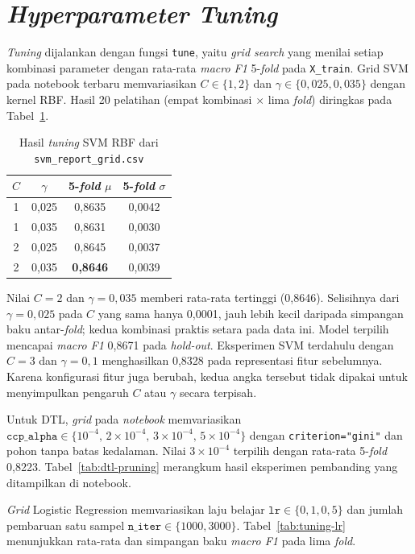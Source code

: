 \section{\textit{Hyperparameter Tuning}}

\textit{Tuning} dijalankan dengan fungsi \texttt{tune}, yaitu \textit{grid search}
yang menilai setiap kombinasi parameter dengan rata-rata \textit{macro F1}
5-\textit{fold} pada \texttt{X\_train}. Grid SVM pada notebook terbaru
memvariasikan $C\in\{1,2\}$ dan $\gamma\in\{0{,}025,0{,}035\}$ dengan
kernel RBF. Hasil 20 pelatihan (empat kombinasi $\times$ lima
\textit{fold}) diringkas pada Tabel~\ref{tab:tuning-svm}.

\begin{table}[H]
	\centering
	\caption{Hasil \textit{tuning} SVM RBF dari \texttt{svm\_report\_grid.csv}}
	\label{tab:tuning-svm}
	\begin{tabular}{c c c c}
		\toprule
		$C$ & $\gamma$ & \textbf{5-\textit{fold} $\mu$} & \textbf{5-\textit{fold} $\sigma$} \\
		\midrule
		1 & 0,025 & 0,8635 & 0,0042 \\
		1 & 0,035 & 0,8631 & 0,0030 \\
		2 & 0,025 & 0,8645 & 0,0037 \\
		2 & 0,035 & \textbf{0,8646} & 0,0039 \\
		\bottomrule
	\end{tabular}
\end{table}

Nilai $C=2$ dan $\gamma=0{,}035$ memberi rata-rata tertinggi (0,8646).
Selisihnya dari $\gamma=0{,}025$ pada $C$ yang sama hanya 0,0001, jauh
lebih kecil daripada simpangan baku antar-\textit{fold}; kedua kombinasi
praktis setara pada data ini. Model terpilih mencapai \textit{macro F1}
0,8671 pada \textit{hold-out}. Eksperimen SVM terdahulu dengan $C=3$ dan
$\gamma=0{,}1$ menghasilkan 0,8328 pada representasi fitur sebelumnya.
Karena konfigurasi fitur juga berubah, kedua angka tersebut tidak dipakai
untuk menyimpulkan pengaruh $C$ atau $\gamma$ secara terpisah.

Untuk DTL, \textit{grid} pada \textit{notebook} memvariasikan
$\texttt{ccp\_alpha}\in\{10^{-4},\,2\times10^{-4},\,3\times10^{-4},\,5\times10^{-4}\}$
dengan \texttt{criterion="gini"} dan pohon tanpa batas kedalaman. Nilai
$3\times10^{-4}$ terpilih dengan rata-rata 5-\textit{fold} 0,8223.
Tabel~\ref{tab:dtl-pruning} merangkum hasil eksperimen pembanding yang
ditampilkan di notebook.

\textit{Grid} Logistic Regression memvariasikan laju belajar
$\texttt{lr}\in\{0{,}1,0{,}5\}$ dan jumlah pembaruan satu sampel
$\texttt{n\_iter}\in\{1000,3000\}$. Tabel~\ref{tab:tuning-lr} menunjukkan
rata-rata dan simpangan baku \textit{macro F1} pada lima \textit{fold}.

